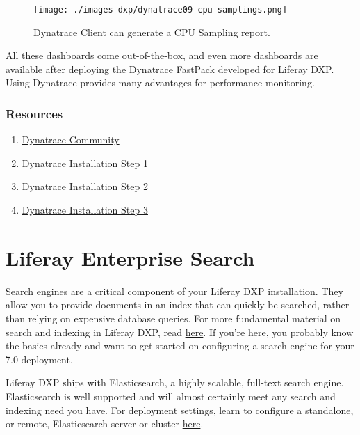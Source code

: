 \begin{figure}
\centering
\texttt{[image: ./images-dxp/dynatrace09-cpu-samplings.png]}
\caption{Dynatrace Client can generate a CPU Sampling report.}
\end{figure}

All these dashboards come out-of-the-box, and even more dashboards are
available after deploying the Dynatrace FastPack developed for Liferay
DXP. Using Dynatrace provides many advantages for performance
monitoring.

\subsection{Resources}\label{resources}

\begin{enumerate}
\def\labelenumi{\arabic{enumi}.}
\tightlist
\item
  \href{https://community.compuwareapm.com}{Dynatrace Community}
\item
  \href{https://community.compuwareapm.com/community/display/EVAL/Step+1+-+Download+and+install+dynaTrace}{Dynatrace
  Installation Step 1}
\item
  \href{https://community.compuwareapm.com/community/display/EVAL/Step+2+-+Activate+License+Key}{Dynatrace
  Installation Step 2}
\item
  \href{https://community.dynatrace.com/community/display/EVAL/Step+3+-+Connect+Agent+to+Dynatrace}{Dynatrace
  Installation Step 3}
\end{enumerate}

\chapter{Liferay Enterprise Search}\label{liferay-enterprise-search}

Search engines are a critical component of your Liferay DXP
installation. They allow you to provide documents in an index that can
quickly be searched, rather than relying on expensive database queries.
For more fundamental material on search and indexing in Liferay DXP,
read
\href{/docs/7-0/tutorials/-/knowledge_base/t/introduction-to-liferay-search}{here}.
If you're here, you probably know the basics already and want to get
started on configuring a search engine for your 7.0 deployment.

Liferay DXP ships with Elasticsearch, a highly scalable, full-text
search engine. Elasticsearch is well supported and will almost certainly
meet any search and indexing need you have. For deployment settings,
learn to configure a standalone, or remote, Elasticsearch server or
cluster
\href{/docs/7-0/deploy/-/knowledge_base/d/configuring-elasticsearch-for-liferay-0}{here}.

